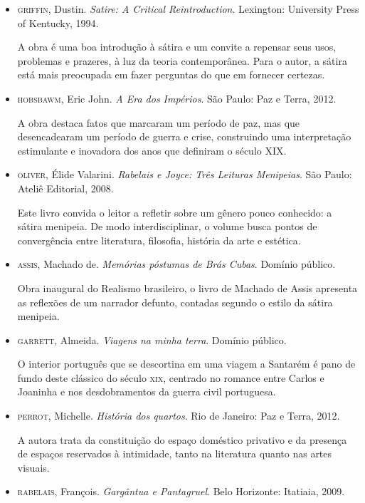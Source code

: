 \documentclass[12pt]{extarticle}
\begin{document}
\begin{itemize}
\item\textsc{griffin}, Dustin. \textit{Satire: A Critical Reintroduction}. Lexington:
University Press of Kentucky, 1994.

A obra é uma boa introdução à sátira e um convite a repensar seus usos,
problemas e prazeres, à luz da teoria contemporânea. Para o autor, a
sátira está mais preocupada em fazer perguntas do que em fornecer
certezas.

\item\textsc{hobsbawm}, Eric John. \textit{A Era dos Impérios}. São Paulo: Paz e Terra, 2012.

A obra destaca fatos que marcaram um período de paz, mas que
desencadearam um período de guerra e crise, construindo uma
interpretação estimulante e inovadora dos anos que definiram o século
XIX.

\item\textsc{oliver}, Élide Valarini. \textit{Rabelais e Joyce: Três Leituras
Menipeias}. São Paulo: Ateliê Editorial, 2008.

Este livro convida o leitor a refletir sobre um gênero pouco conhecido:
a sátira menipeia. De modo interdisciplinar, o volume busca pontos de
convergência entre literatura, filosofia, história da arte e estética.

\item\textsc{assis}, Machado de. \textit{Memórias póstumas de Brás Cubas}. Domínio
público.

Obra inaugural do Realismo brasileiro, o livro de Machado de Assis
apresenta as reflexões de um narrador defunto, contadas segundo o estilo
da sátira menipeia.

\item\textsc{garrett}, Almeida. \textit{Viagens na minha terra}. Domínio público.

O interior português que se descortina em uma viagem a Santarém é pano
de fundo deste clássico do século \textsc{xix}, centrado no romance entre Carlos
e Joaninha e nos desdobramentos da guerra civil portuguesa.

\item\textsc{perrot}, Michelle. \textit{História dos quartos}. Rio de Janeiro: Paz e
Terra, 2012.

A autora trata da constituição do espaço doméstico privativo e da
presença de espaços reservados à intimidade, tanto na literatura quanto
nas artes visuais.

\item\textsc{rabelais}, François. \textit{Gargântua e Pantagruel}. Belo Horizonte:
Itatiaia, 2009.


\end{itemize}
\end{document}
